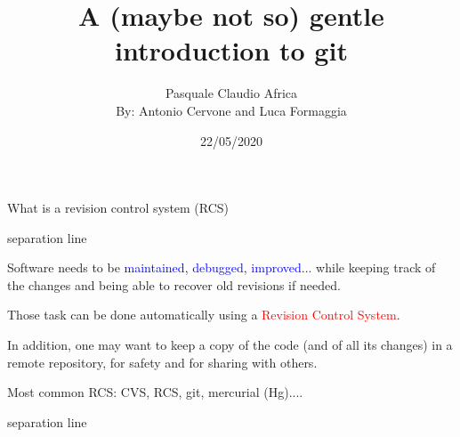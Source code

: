 \documentclass[hyperref={colorlinks}]{beamer}
\author{Pasquale Claudio Africa\protect\\{\small By: Antonio Cervone and Luca Formaggia}}
\title{A (maybe not so) gentle introduction to git}
\date{22/05/2020}
\newcommand{\titleline}[1][0.025cm]{%
\begin{beamercolorbox}[wd=\paperwidth,ht=#1,center]{separation line}%
\end{beamercolorbox}%
}
\begin{document}
\begin{frame}
\titlepage
\end{frame}
\begin{frame}{What is a revision control system (RCS)}
\titleline
{\small
  Software needs to be \textcolor{blue}{maintained},
 \textcolor{blue}{debugged}, \textcolor{blue}{improved}...
while keeping track of the changes and being able to recover old revisions if needed.
\medskip

Those task can be done automatically using a \textcolor{red}{Revision Control System}.
\medskip

In addition, one may want to keep a copy of the code (and of all its changes) in a remote repository, for safety and for sharing with others.

\smallskip

Most common RCS: CVS, RCS, git, mercurial (Hg)....
}
\titleline
\end{frame}
\end{document}

